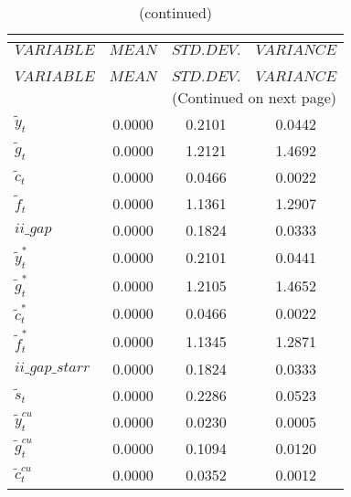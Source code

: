  
\begin{center}
\begin{longtable}{lccc} 
\caption{THEORETICAL MOMENTS}\\
 \label{Table:th_moments}\\
\toprule 
$VARIABLE                 $	 & 	 $         MEAN$	 & 	 $    STD. DEV.$	 & 	 $     VARIANCE$\\
\midrule \endfirsthead 
\caption{(continued)}\\
 \toprule \\ 
$VARIABLE                 $	 & 	 $         MEAN$	 & 	 $    STD. DEV.$	 & 	 $     VARIANCE$\\
\midrule \endhead 
\midrule \multicolumn{4}{r}{(Continued on next page)} \\ \bottomrule \endfoot 
\bottomrule \endlastfoot 
${\tilde y_t}             $	 & 	       0.0000	 & 	       0.2101	 & 	       0.0442 \\ 
${\tilde g_t}             $	 & 	       0.0000	 & 	       1.2121	 & 	       1.4692 \\ 
${\tilde c_t}             $	 & 	       0.0000	 & 	       0.0466	 & 	       0.0022 \\ 
${\tilde f_t}             $	 & 	       0.0000	 & 	       1.1361	 & 	       1.2907 \\ 
$ii\_gap                  $	 & 	       0.0000	 & 	       0.1824	 & 	       0.0333 \\ 
${\tilde y_t^*}           $	 & 	       0.0000	 & 	       0.2101	 & 	       0.0441 \\ 
${\tilde g_t^*}           $	 & 	       0.0000	 & 	       1.2105	 & 	       1.4652 \\ 
${\tilde c_t^*}           $	 & 	       0.0000	 & 	       0.0466	 & 	       0.0022 \\ 
${\tilde f_t^*}           $	 & 	       0.0000	 & 	       1.1345	 & 	       1.2871 \\ 
$ii\_gap\_starr           $	 & 	       0.0000	 & 	       0.1824	 & 	       0.0333 \\ 
${\tilde s_t}             $	 & 	       0.0000	 & 	       0.2286	 & 	       0.0523 \\ 
${\tilde y_t^{cu}}        $	 & 	       0.0000	 & 	       0.0230	 & 	       0.0005 \\ 
${\tilde g_t^{cu}}        $	 & 	       0.0000	 & 	       0.1094	 & 	       0.0120 \\ 
${\tilde c_t^{cu}}        $	 & 	       0.0000	 & 	       0.0352	 & 	       0.0012 \\ 

\end{longtable}
\end{center}
